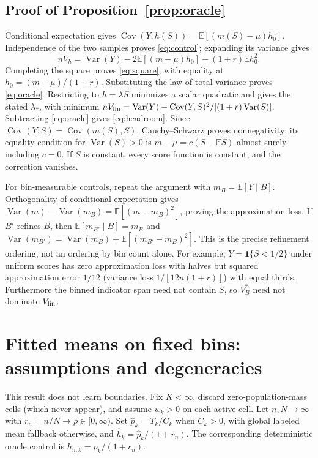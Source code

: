 \documentclass{article}
\newcommand{\E}{\mathbb E}
\newcommand{\Var}{\operatorname{Var}}
\newcommand{\Cov}{\operatorname{Cov}}
\begin{document}
\subsection{Proof of Proposition~\ref{prop:oracle}}
Conditional expectation gives $\Cov(Y,h(S))=\E[(m(S)-\mu)h_0]$. Independence of the two samples proves \eqref{eq:control}; expanding its variance gives
\begin{equation}\label{eq:expand}
 nV_h=\Var(Y)-2\E[(m-\mu)h_0]+(1+r)\E h_0^2.
\end{equation}
Completing the square proves \eqref{eq:square}, with equality at $h_0=(m-\mu)/(1+r)$. Substituting the law of total variance proves \eqref{eq:oracle}. Restricting to $h=\lambda S$ minimizes a scalar quadratic and gives the stated $\lambda_*$, with minimum $nV_{\rm lin}=\Var(Y)-\Cov(Y,S)^2/[(1+r)\Var(S)]$. Subtracting \eqref{eq:oracle} gives \eqref{eq:headroom}. Since $\Cov(Y,S)=\Cov(m(S),S)$, Cauchy--Schwarz proves nonnegativity; its equality condition for $\Var(S)>0$ is $m-\mu=c(S-\E S)$ almost surely, including $c=0$. If $S$ is constant, every score function is constant, and the correction vanishes.

For bin-measurable controls, repeat the argument with $m_B=\E[Y\mid B]$. Orthogonality of conditional expectation gives $\Var(m)-\Var(m_B)=\E[(m-m_B)^2]$, proving the approximation loss. If $B'$ refines $B$, then $\E[m_{B'}\mid B]=m_B$ and $\Var(m_{B'})=\Var(m_B)+\E[(m_{B'}-m_B)^2]$. This is the precise refinement ordering, not an ordering by bin count alone. For example, $Y=\mathbf1\{S<1/2\}$ under uniform scores has zero approximation loss with halves but squared approximation error $1/12$ (variance loss $1/[12n(1+r)]$) with equal thirds. Furthermore the binned indicator span need not contain $S$, so $V^*_B$ need not dominate $V_{\rm lin}$.

\section{Fitted means on fixed bins: assumptions and degeneracies}\label{app:plugin}
This result does not learn boundaries. Fix $K<\infty$, discard zero-population-mass cells (which never appear), and assume $w_k>0$ on each active cell. Let $n,N\to\infty$ with $r_n=n/N\to\rho\in[0,\infty)$. Set $\widehat p_k=T_k/C_k$ when $C_k>0$, with global labeled mean fallback otherwise, and $\widehat h_k=\widehat p_k/(1+r_n)$. The corresponding deterministic oracle control is $h_{n,k}=p_k/(1+r_n)$.
\end{document}
